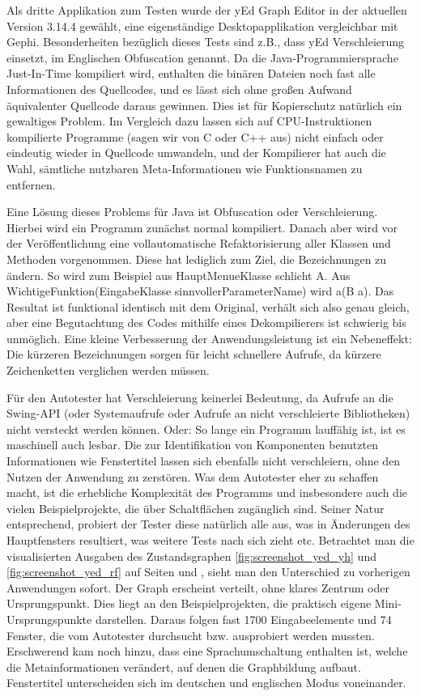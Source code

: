 Als dritte Applikation zum Testen wurde der yEd Graph Editor 
in der aktuellen Version 3.14.4 gewählt,
eine eigenständige Desktopapplikation vergleichbar mit Gephi.
Besonderheiten bezüglich dieses Tests sind z.B., dass yEd Verschleierung
einsetzt, im Englischen Obfuscation genannt. Da die Java-Programmiersprache
Just-In-Time kompiliert wird, enthalten die \glqq{}binären\grqq{}
Dateien noch fast alle Informationen des Quellcodes, und es lässt sich ohne
großen Aufwand äquivalenter Quellcode daraus gewinnen. Dies ist für
Kopierschutz natürlich ein gewaltiges Problem. Im Vergleich dazu lassen
sich auf CPU-Instruktionen kompilierte Programme (sagen wir von C oder C++ aus)
nicht einfach oder eindeutig wieder in Quellcode umwandeln, und der Kompilierer
hat auch die Wahl, sämtliche nutzbaren Meta-Informationen wie Funktionsnamen
zu entfernen.

Eine Lösung dieses Problems für Java ist Obfuscation oder
Verschleierung. Hierbei wird ein Programm zunächst normal kompiliert. 
Danach aber wird vor der Veröffentlichung eine vollautomatische 
Refaktorisierung aller Klassen und Methoden vorgenommen.
Diese hat lediglich zum Ziel, die Bezeichnungen zu ändern. So wird
zum Beispiel aus \glqq{}HauptMenueKlasse\grqq{} schlicht \glqq{}A\grqq{}.
Aus \glqq{}WichtigeFunktion(EingabeKlasse sinnvollerParameterName)\grqq{}
wird \glqq{}a(B a)\grqq{}. Das Resultat ist funktional identisch mit dem
Original, verhält sich also genau gleich, aber eine Begutachtung des
Codes mithilfe eines Dekompilierers ist schwierig bis unmöglich.
Eine kleine Verbesserung der Anwendungsleistung ist ein Nebeneffekt:
Die kürzeren Bezeichnungen sorgen für leicht schnellere Aufrufe, da
kürzere Zeichenketten verglichen werden müssen.

Für den Autotester hat Verschleierung keinerlei Bedeutung, da Aufrufe
an die Swing-API (oder Systemaufrufe oder Aufrufe an nicht verschleierte 
Bibliotheken) nicht versteckt werden können. Oder: So lange ein Programm
lauffähig ist, ist es maschinell auch lesbar. Die zur Identifikation von Komponenten
benutzten Informationen wie Fenstertitel lassen sich ebenfalls nicht verschleiern,
ohne den Nutzen der Anwendung zu zerstören. Was dem Autotester eher
zu schaffen macht, ist die erhebliche Komplexität des Programms und
insbesondere auch die vielen Beispielprojekte, die über Schaltflächen
zugänglich sind. Seiner Natur entsprechend, probiert der Tester diese
natürlich alle aus, was in Änderungen des Hauptfensters resultiert, was
weitere Tests nach sich zieht etc. Betrachtet man die visualisierten
Ausgaben des Zustandsgraphen \ref{fig:screenshot_yed_yh} und 
\ref{fig:screenshot_yed_rf}  auf Seiten \pageref{fig:screenshot_yed_yh} 
und \pageref{fig:screenshot_yed_rf}, sieht man den Unterschied zu vorherigen
Anwendungen sofort. Der Graph erscheint verteilt, ohne klares Zentrum
oder Ursprungspunkt. Dies liegt an den Beispielprojekten, die praktisch
eigene Mini-Ursprungspunkte darstellen. Daraus folgen fast 1700
Eingabeelemente und 74 Fenster, die vom Autotester durchsucht
bzw. ausprobiert werden mussten. Erschwerend kam noch hinzu,
dass eine Sprachumschaltung enthalten ist, welche die Metainformationen
verändert, auf denen die Graphbildung aufbaut. Fenstertitel
unterscheiden sich im deutschen und englischen Modus voneinander.


